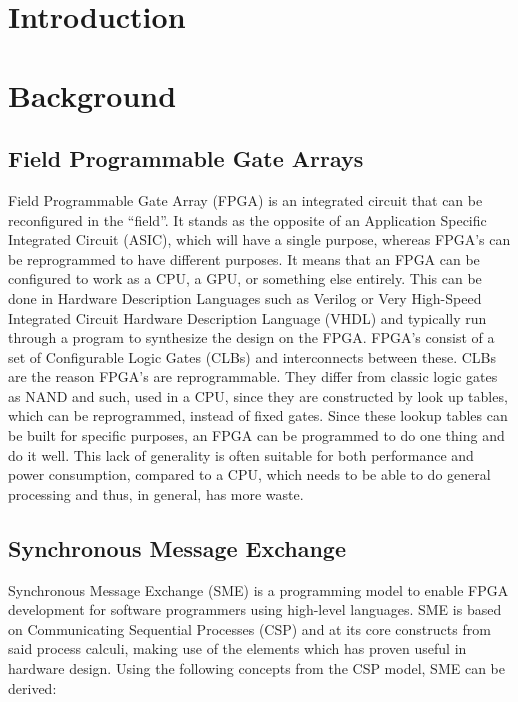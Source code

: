 \documentclass[a4paper]{article}
\date{}
\title{}
\begin{document}
\maketitle
\tableofcontents
\newpage
\section{Introduction}
\label{sec:orge131410}

\section{Background}
\label{sec:org0fe9689}

\subsection{Field Programmable Gate Arrays}
\label{sec:orgda082ec}
Field Programmable Gate Array (FPGA) is an integrated circuit that can be reconfigured in the ``field''. It stands as the opposite of an Application Specific Integrated Circuit (ASIC), which will have a single purpose, whereas FPGA's can be reprogrammed to have different purposes. It means that an FPGA can be configured to work as a CPU, a GPU, or something else entirely. This can be done in Hardware Description Languages such as Verilog or Very High-Speed Integrated Circuit Hardware Description Language (VHDL) and typically run through a program to synthesize the design on the FPGA.
FPGA's consist of a set of Configurable Logic Gates (CLBs) and interconnects between these. CLBs are the reason FPGA's are reprogrammable. They differ from classic logic gates as NAND and such, used in a CPU, since they are constructed by look up tables, which can be reprogrammed, instead of fixed gates. Since these lookup tables can be built for specific purposes, an FPGA can be programmed to do one thing and do it well. This lack of generality is often suitable for both performance and power consumption, compared to a CPU, which needs to be able to do general processing and thus, in general, has more waste.

\subsection{Synchronous Message Exchange}
\label{sec:SME}
Synchronous Message Exchange (SME) is a programming model to enable FPGA development for software programmers using high-level languages. SME is based on Communicating Sequential Processes (CSP) and at its core constructs from said process calculi, making use of the elements which has proven useful in hardware design\cite{sme}. Using the following concepts from the CSP model\cite{CSP}, SME can be derived:
\end{document}

